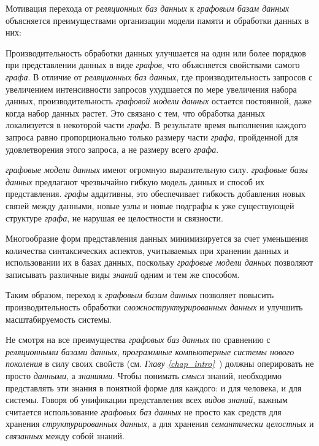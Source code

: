 Мотивация перехода от \textit{реляционных баз данных} к \textit{графовым базам данных} объясняется преимуществами организации модели памяти и обработки данных в них:
\begin{textitemize}
    \item Производительность обработки данных улучшается на один или более порядков при представлении данных в виде \textit{графов}, что объясняется свойствами самого \textit{графа}. В отличие от \textit{реляционных баз данных}, где производительность запросов с увеличением интенсивности запросов ухудшается по мере увеличения набора данных, производительность \textit{графовой модели данных} остается постоянной, даже когда набор данных растет. Это связано с тем, что обработка данных локализуется в некоторой части \textit{графа}. В результате время выполнения каждого запроса равно пропорционально только размеру части \textit{графа}, пройденной для удовлетворения этого запроса, а не размеру всего \textit{графа}.
    \item \textit{графовые модели данных} имеют огромную выразительную силу. \textit{графовые базы данных} предлагают чрезвычайно гибкую модель данных и способ их представления. \textit{графы} аддитивны, это обеспечивает гибкость добавления новых связей между данными, новые узлы и новые подграфы к уже существующей структуре \textit{графа}, не нарушая ее целостности и связности.
   	\item Многообразие форм представления данных минимизируется за счет уменьшения количества синтаксических аспектов, учитываемых при хранении данных и использовании их в базах данных, поскольку \textit{графовые модели данных} позволяют записывать различные виды \textit{знаний} одним и тем же способом.
\end{textitemize}

Таким образом, переход к \textit{графовым базам данных} позволяет повысить производительность обработки \textit{сложноструктурированных данных} и улучшить масштабируемость системы.

Не смотря на все преимущества \textit{графовых баз данных} по сравнению с \textit{реляционными базами данных}, \textit{программные компьютерные системы нового поколения} в силу своих свойств (см. \textit{Главу \ref{chap_intro}~}) должны оперировать не просто \textit{данными}, а \textit{знаниями}. Чтобы понимать \textit{смысл} знаний, необходимо представлять эти знания в понятной форме для каждого: и для человека, и для системы. Говоря об унификации представления всех \textit{видов знаний}, важным считается использование \textit{графовых баз данных} не просто как средств для хранения \textit{структурированных данных}, а для хранения \textit{семантически целостных} и \textit{связанных} между собой знаний.

